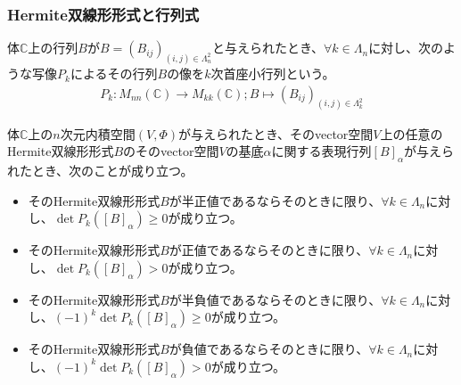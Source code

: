 \documentclass[dvipdfmx]{jsarticle}
\begin{document}
\subsubsection{Hermite双線形形式と行列式}%
\begin{dfn}
体$\mathbb{C}$上の行列$B$が$B = \left( B_{ij} \right)_{(i,j) \in \varLambda_{n}^{2}}$と与えられたとき、$\forall k \in \varLambda_{n}$に対し、次のような写像$P_{k}$によるその行列$B$の像を$k$次首座小行列という。
\begin{align*}
P_{k}:M_{nn}\left( \mathbb{C} \right) \rightarrow M_{kk}\left( \mathbb{C} \right);B \mapsto \left( B_{ij} \right)_{(i,j) \in \varLambda_{k}^{2}}
\end{align*}
\end{dfn}
\begin{thm}\label{2.3.10.6}
体$\mathbb{C}$上の$n$次元内積空間$(V,\varPhi)$が与えられたとき、そのvector空間$V$上の任意のHermite双線形形式$B$のそのvector空間$V$の基底$\alpha$に関する表現行列$[ B]_{\alpha}$が与えられたとき、次のことが成り立つ。
\begin{itemize}
\item
  そのHermite双線形形式$B$が半正値であるならそのときに限り、$\forall k \in \varLambda_{n}$に対し、$\det{P_{k}\left( [ B]_{\alpha} \right)} \geq 0$が成り立つ。
\item
  そのHermite双線形形式$B$が正値であるならそのときに限り、$\forall k \in \varLambda_{n}$に対し、$\det{P_{k}\left( [ B]_{\alpha} \right)} > 0$が成り立つ。
\item
  そのHermite双線形形式$B$が半負値であるならそのときに限り、$\forall k \in \varLambda_{n}$に対し、$( - 1)^{k}\det{P_{k}\left( [ B]_{\alpha} \right)} \geq 0$が成り立つ。
\item
  そのHermite双線形形式$B$が負値であるならそのときに限り、$\forall k \in \varLambda_{n}$に対し、$( - 1)^{k}\det{P_{k}\left( [ B]_{\alpha} \right)} > 0$が成り立つ。
\end{itemize}
\end{thm}
\end{document}
